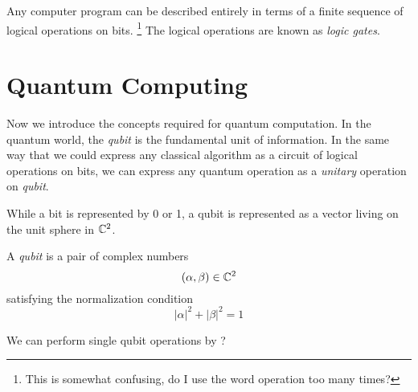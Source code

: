         Any computer program can be described entirely in terms of a finite sequence of logical operations on bits.
        \footnote{This is somewhat confusing, do I use the word operation too many times?}
        The logical operations are known as \emph{logic gates}. 


        


\section{Quantum Computing} 
        
        Now we introduce the concepts required for quantum computation. In the quantum world, the \emph{qubit} is 
        the fundamental unit of information. In the same way that we could express any classical algorithm as a 
        circuit of logical operations on bits, we can express any quantum operation as a \emph{unitary} operation 
        on \emph{qubit}. 

        While a bit is represented by 0 or 1, a qubit is represented as a vector living on the unit sphere in 
        $\mathbb{C}^2$.

        \begin{definition}
            A \emph{qubit} is a pair of complex numbers
            \[
                (\alpha, \beta) \in \mathbb{C}^2
            \]
            satisfying the normalization condition %
            \[
                |\alpha|^2 + |\beta|^2 = 1
            \]
        \end{definition}
        
        We can perform single qubit operations by  ?
        

